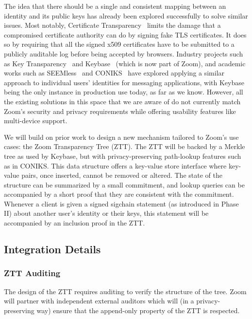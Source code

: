 The idea that there should be a single and consistent mapping between an identity and its public keys has already been explored successfully to solve similar issues. Most notably, Certificate Transparency~\cite{langley2013certificate} limits the damage that a compromised certificate authority can do by signing fake TLS certificates. It does so by requiring that all the signed x509 certificates have to be submitted to a publicly auditable log before being accepted by browsers. Industry projects such as Key Transparency~\cite{keytransparency} and Keybase~\cite{keybase} (which is now part of Zoom), and academic works such as SEEMless~\cite{chase2019seemless} and CONIKS~\cite{melara2015coniks} have explored applying a similar approach to individual users' identities for messaging applications, with Keybase being the only instance in production use today, as far as we know. However, all the existing solutions in this space that we are aware of do not currently match Zoom's security and privacy requirements while offering usability features like multi-device support.

We will build on prior work to design a new mechanism tailored to Zoom's use cases: the Zoom Transparency Tree (ZTT). The ZTT will be backed by a Merkle tree as used by Keybase, but with privacy-preserving path-lookup features such as in CONIKS. This data structure offers a key-value store interface where key-value pairs, once inserted, cannot be removed or altered. The state of the structure can be summarized by a small commitment, and lookup queries can be accompanied by a short proof that they are consistent with the commitment. Whenever a client is given a signed sigchain statement (as introduced in Phase II) about another user's identity or their keys, this statement will be accompanied by an inclusion proof in the ZTT.

\subsection{Integration Details}

\subsubsection{ZTT Auditing}

The design of the ZTT requires auditing to verify the structure of the tree. Zoom will partner with independent external auditors which will (in a privacy-preserving way) ensure that the append-only property of the ZTT is respected.

